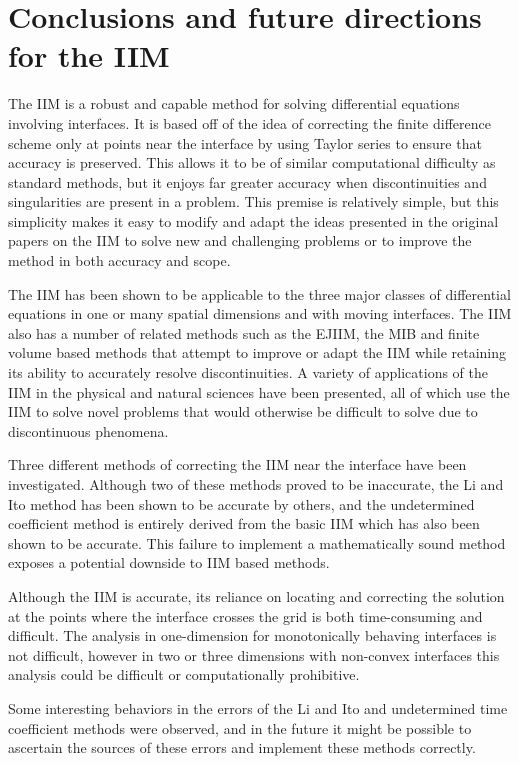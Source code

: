 \section{Conclusions and future directions for the IIM}
The IIM is a robust and capable method for solving differential equations involving interfaces.
It is based off of the idea of correcting the finite difference scheme only at points near the interface by using Taylor series to ensure that accuracy is preserved.
This allows it to be of similar computational difficulty as standard methods, but it enjoys far greater accuracy when discontinuities and singularities are present in a problem.
This premise is relatively simple, but this simplicity makes it easy to modify and adapt the ideas presented in the original papers on the IIM to solve new and challenging problems or to improve the method in both accuracy and scope.

The IIM has been shown to be applicable to the three major classes of differential equations in one or many spatial dimensions and with moving interfaces.
The IIM also has a number of related methods such as the EJIIM, the MIB and finite volume based methods that attempt to improve or adapt the IIM while retaining its ability to accurately resolve discontinuities.
A variety of applications of the IIM in the physical and natural sciences have been presented, all of which use the IIM to solve novel problems that would otherwise be difficult to solve due to discontinuous phenomena.

Three different methods of correcting the IIM near the interface have been investigated.
Although two of these methods proved to be inaccurate, the Li and Ito method has been shown to be accurate by others, and the undetermined coefficient method is entirely derived from the basic IIM which has also been shown to be accurate.
This failure to implement a mathematically sound method exposes a potential downside to IIM based methods.

Although the IIM is accurate, its reliance on locating and correcting the solution at the points where the interface crosses the grid is both time-consuming and difficult.
The analysis in one-dimension for monotonically behaving interfaces is not difficult, however in two or three dimensions with non-convex interfaces this analysis could be difficult or computationally prohibitive.

Some interesting behaviors in the errors of the Li and Ito and undetermined time coefficient methods were observed, and in the future it might be possible to ascertain the sources of these errors and implement these methods correctly.


